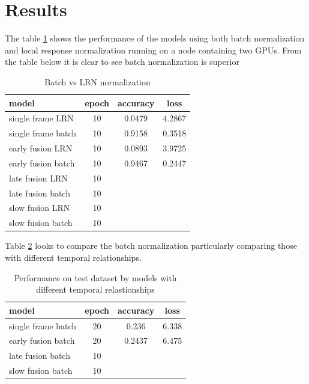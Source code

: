 \documentclass[10pt,phd,a4paper,oneside]{article}
\begin{document}
    \section{Results}
    The table \ref{lrnvsbatch} shows the performance of the models using both batch normalization and local response normalization running on a node containing two GPUs. From the table below it is clear to see batch normalization is superior
    \begin{table}[h!]
        \begin{center}
            \begin{tabular}{ |l|c|c|c| }
                \hline
                model & epoch & accuracy & loss \\
                \hline
                single frame LRN & 10 & 0.0479 & 4.2867 \\
                single frame batch  & 10 & 0.9158 & 0.3518 \\
                early fusion LRN & 10 & 0.0893 & 3.9725 \\
                early fusion batch & 10 & 0.9467 &  0.2447  \\
                late fusion LRN & 10 &  &  \\
                late fusion batch & 10 &  & \\
                slow fusion LRN & 10 &  &  \\
                slow fusion batch & 10 &  &  \\
                \hline
            \end{tabular}
            \caption{Batch vs LRN normalization}
            \label{lrnvsbatch}
        \end{center}
    \end{table}

    Table \ref{fusions} looks to compare the batch normalization particularly comparing those with different temporal relationships.

    \begin{table}[h!]
        \begin{center}
            \begin{tabular}{ |l|c|c|c| }
                \hline
                model & epoch &accuracy & loss \\
                \hline
                single frame batch  & 20   & 0.236 & 6.338 \\
                early fusion batch  & 20 & 0.2437 &  6.475  \\
                late fusion batch   & 10 &  & \\
                slow fusion batch   & 10 &  &  \\
                \hline
            \end{tabular}
            \caption{ Performance on test dataset by models with different temporal relastionships}
            \label{fusions}
        \end{center}
    \end{table}
\end{document}
